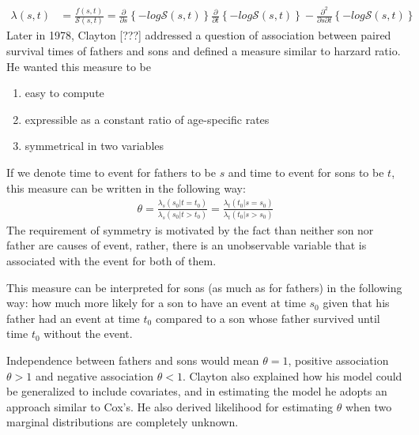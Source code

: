 \documentclass[]{article}
\begin{document}
$$
\begin{aligned}
	\lambda(s,t) &= \frac{f(s,t)}{\mathcal{S}(s,t)} = \frac{\partial}{\partial s}\left\{  -log \mathcal{S}(s,t)  \right\}\frac{\partial}{\partial t}\left\{  -log \mathcal{S}(s,t)  \right\} - \frac{\partial^2}{\partial s\partial t}\left\{  -log \mathcal{S}(s,t)  \right\}
\end{aligned}
$$
Later in 1978, Clayton [???] addressed a question of association between paired survival times of fathers and sons and defined a measure similar to harzard ratio. He wanted this measure to be
\begin{enumerate}
	\item  easy to compute
	\item expressible as a constant ratio of age-specific rates
  \item symmetrical in two variables
\end{enumerate}
If we denote time to event for fathers to be $s$ and time to event for sons to be $t$, this measure can be written in the following way:
$$
\begin{aligned}
	\theta = \frac{\lambda_s(s_0|t=t_0)}{\lambda_s(s_0|t>t_0)} = \frac{\lambda_t(t_0|s=s_0)}{\lambda_t(t_0|s>s_0)}
\end{aligned}
$$
The requirement of symmetry is motivated by the fact than neither son nor father are causes of event, rather, there is an unobservable variable that is associated with the event for both of them.

This measure can be interpreted for sons (as much as for fathers) in the following way: how much more likely for a son to have an event at time $s_0$ given that his father had an event at time $t_0$ compared to a son whose father survived until time $t_0$ without the event.

Independence between fathers and sons would mean $\theta = 1$, positive association $\theta > 1$ and negative association $\theta < 1$. Clayton also explained how his model could be generalized to include covariates, and in estimating the model he adopts an approach similar to Cox's. He also derived likelihood for estimating $\theta$ when two marginal distributions are completely unknown.\\
\end{document}
